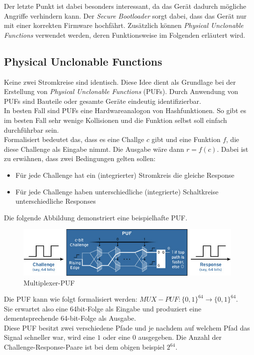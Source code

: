 \documentclass[conference]{IEEEtran}
\begin{document}
Der letzte Punkt ist dabei besonders interessant, da das Gerät dadurch mögliche Angriffe verhindern kann. Der \textit{Secure Bootloader} sorgt dabei, dass das Gerät nur mit einer korrekten Firmware hochfährt. Zusätzlich können \textit{Physical Unclonable Functions} verwendet werden, deren Funktionsweise im Folgenden erläutert wird.

\subsection{Physical Unclonable Functions}
Keine zwei Stromkreise sind identisch. Diese Idee dient als Grundlage bei der Erstellung von \textit{Physical Unclonable Functions} (PUFs). Durch Anwendung von PUFs sind Bauteile oder gesamte Geräte eindeutig identifizierbar.\\
In besten Fall sind PUFs eine Hardwareanalogon von Hashfunktionen. So gibt es im besten Fall sehr wenige Kollisionen und die Funktion selbst soll einfach durchführbar sein.\\
Formalisiert bedeutet das, dass es eine Challge $c$ gibt und eine Funktion $f$, die diese Challenge als Eingabe nimmt. Die Ausgabe wäre dann $r = f(c)$. 
\newpage
Dabei ist zu erwähnen, dass zwei Bedingungen gelten sollen:
\begin{itemize}
  \item Für jede Challenge hat ein (integrierter) Stromkreis die gleiche Response
  \item Für jede Challenge haben unterschiedliche (integrierte) Schaltkreise unterschiedliche Responses 
\end{itemize}

Die folgende Abbildung demonstriert eine beispielhafte PUF. 

\begin{figure}[h]
\centering
  \includegraphics[width=\columnwidth]{puf}
  \caption{Multiplexer-PUF}
  \label{fig:puf}
\end{figure}

Die PUF kann wie folgt formalisiert werden: $MUX-PUF: \{0,1\}^{64} \rightarrow \{0,1\}^{64}$. \\
Sie erwartet also eine 64bit-Folge als Eingabe und produziert eine dementsprechende 64-bit-Folge als Ausgabe.\\
Diese PUF besitzt zwei verschiedene Pfade und je nachdem auf welchem Pfad das Signal schneller war, wird eine $1$ oder eine $0$ ausgegeben. Die Anzahl der Challenge-Response-Paare ist bei dem obigen beispiel $2^{64}$.\cite{webpufs}\\
\end{document}
